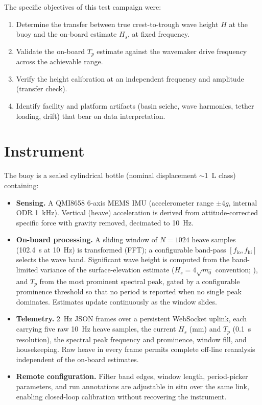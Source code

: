 \documentclass[11pt,a4paper]{article}
\begin{document}
The specific objectives of this test campaign were:
\begin{enumerate}
  \item Determine the transfer between true crest-to-trough wave height $H$
        at the buoy and the on-board estimate $H_s$, at fixed frequency.
  \item Validate the on-board $T_p$ estimate against the wavemaker drive
        frequency across the achievable range.
  \item Verify the height calibration at an independent frequency and
        amplitude (transfer check).
  \item Identify facility and platform artifacts (basin seiche, wave
        harmonics, tether loading, drift) that bear on data interpretation.
\end{enumerate}

\section{Instrument}
\label{sec:instrument}
The buoy is a sealed cylindrical bottle (nominal displacement
$\sim$\SI{1}{\liter} class) containing:

\begin{itemize}
  \item \textbf{Sensing.} A QMI8658 6-axis MEMS IMU (accelerometer range
        $\pm 4g$, internal ODR \SI{1}{\kilo\hertz}). Vertical (heave)
        acceleration is derived from attitude-corrected specific force with
        gravity removed, decimated to \SI{10}{\hertz}.
  \item \textbf{On-board processing.} A sliding window of $N = 1024$ heave
        samples (\SI{102.4}{\second} at \SI{10}{\hertz}) is transformed
        (FFT); a configurable band-pass $[f_{\mathrm{lo}}, f_{\mathrm{hi}}]$
        selects the wave band. Significant wave height is computed from the
        band-limited variance of the surface-elevation estimate
        ($H_{s}=4\sqrt{m_0}$ convention; \citealt{holthuijsen2007}), and $T_p$
        from the most prominent spectral peak, gated by a configurable
        prominence threshold so that no period is reported when no single
        peak dominates. Estimates update continuously as the window slides.
  \item \textbf{Telemetry.} \SI{2}{\hertz} JSON frames over a persistent
        WebSocket uplink, each carrying five raw \SI{10}{\hertz} heave
        samples, the current $H_s$ (\si{\milli\meter}) and $T_p$
        (\SI{0.1}{\second} resolution), the spectral peak frequency and
        prominence, window fill, and housekeeping. Raw heave in every frame
        permits complete off-line reanalysis independent of the on-board
        estimates.
  \item \textbf{Remote configuration.} Filter band edges, window length,
        period-picker parameters, and run annotations are adjustable in situ
        over the same link, enabling closed-loop calibration without
        recovering the instrument.
\end{itemize}
\end{document}
